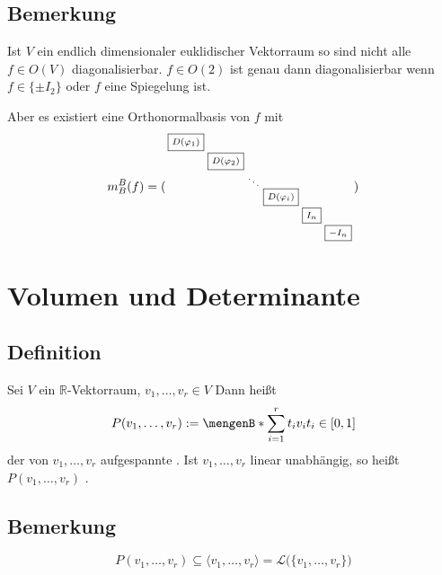 \subsection[Bemerkung über die Diagonalisierbarkeit von Isometrien auf euklidischen Vektorräumen]{Bemerkung} %
\label{sub:114}
Ist $V$ ein endlich dimensionaler euklidischer Vektorraum so sind nicht alle $f \in O(V)$ diagonalisierbar. $f \in O(2)$ ist genau dann diagonalisierbar wenn 
$f \in \{ \pm I_2 \}$ oder $f$ eine Spiegelung ist.

Aber es existiert eine Orthonormalbasis von $f$ mit
\[
	m_B^B(f) = (\begin{smallmatrix}
		\boxed{ \scriptstyle D(\varphi_1)} &  &  & & & \\
		& \boxed{ \scriptstyle D(\varphi_2)} &  & & & \\
		& & \ddots & & & \\
		& & & \boxed{ \scriptstyle D(\varphi_i)} & & \\
		& & & & \boxed{ \scriptstyle I_n} & \\
		& & & & & \boxed{ \scriptstyle - I_n}
	\end{smallmatrix})
\]
\newpage
\section{Volumen und Determinante} %
\label{sec:2}
\subsection[Definition Parallelotop]{Definition} %
\label{sub:21}
Sei $V$ ein $\mathds{R}$-Vektorraum, $v_1, \ldots , v_r \in V$ Dann heißt
\[
	P(v_1, \ldots , v_r) := \set[\sum_{i=1}^{r} t_i v_i]{t_i \in [0,1]} 
\]
der von $v_1, \ldots , v_r$ aufgespannte . Ist $v_1, \ldots , v_r$ linear unabhängig, 
so heißt $P(v_1, \ldots , v_r)$ .  

\subsection[Bemerkung Prallelotope sind Teilmenge der linearen Hülle]{Bemerkung} %
\label{sub:22}
\[
	P(v_1, \ldots , v_r) \subseteq \langle v_1, \ldots , v_r \rangle = \mathcal{L} \big(\{ v_1, \ldots , v_r \}\big) 
\]

